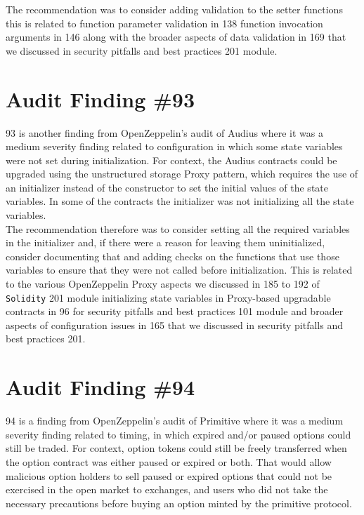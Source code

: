 The recommendation was to consider adding validation to the setter functions this is related to function parameter validation in 138 function invocation arguments in 146 along with the broader aspects of data validation in 169 that we discussed in security pitfalls and best practices 201 module.

\section{Audit Finding \#93}

93 is another finding from OpenZeppelin's audit of Audius where it was a medium severity finding related to configuration in which some state variables were not set during initialization. For context, the Audius contracts could be upgraded using the unstructured storage Proxy pattern, which requires the use of an initializer instead of the constructor to set the initial values of the state variables. In some of the contracts the initializer was not initializing all the state variables.\\

The recommendation therefore was to consider setting all the required variables in the initializer and, if there were a reason for leaving them uninitialized, consider documenting that and adding checks on the functions that use those variables to ensure that they were not called before initialization. This is related to the various OpenZeppelin Proxy aspects we discussed in 185 to 192 of \verb|Solidity| 201 module initializing state variables in Proxy-based upgradable contracts in 96 for security pitfalls and best practices 101 module and broader aspects of configuration issues in 165 that we discussed in security pitfalls and best practices 201.

\section{Audit Finding \#94}

94 is a finding from OpenZeppelin's audit of Primitive where it was a medium severity finding related to timing, in which expired and/or paused options could still be traded. For context, option tokens could still be freely transferred when the option contract was either paused or expired or both. That would allow malicious option holders to sell paused or expired options that could not be exercised in the open market to exchanges, and users who did not take the necessary precautions before buying an option minted by the primitive protocol.

